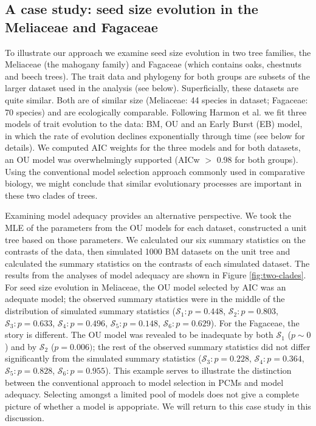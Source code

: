 \documentclass[a4paper,12pt]{article}
\begin{document}
\subsection{A case study: seed size evolution in the Meliaceae and Fagaceae }
To illustrate our approach we examine seed size evolution in two tree families, the Meliaceae (the mahogany family) and Fagaceae (which contains oaks, chestnuts and beech trees). The trait data and phylogeny for both groups are subsets of the larger dataset used in the analysis (see below). Superficially, these datasets are quite similar. Both are of similar size (Meliaceae: 44 species in dataset; Fagaceae: 70 species) and are ecologically comparable. Following Harmon et al. \citep{Harmon2010} we fit three models of trait evolution to the data: BM, OU and an Early Burst (EB) model, in which the rate of evolution declines exponentially through time \citep{Blomberg2003, Harmon2010} (see below for details). We computed AIC weights \citep{aicweight} for the three models and for both datasets, an OU model was overwhelmingly supported (AICw $>$ 0.98 for both groups). Using the conventional model selection approach commonly used in comparative biology, we might conclude that similar evolutionary processes are important in these two clades of trees.

Examining model adequacy provides an alternative perspective. We took the MLE of the parameters from the OU models for each dataset, constructed a unit tree based on those parameters. We calculated our six summary statistics on the contrasts of the data, then simulated 1000 BM datasets on the unit tree and calculated the summary statistics on the contrasts of each simulated dataset. The results from the analyses of model adequacy are shown in Figure \ref{fig:two-clades}. For seed size evolution in Meliaceae, the OU model selected by AIC was an adequate model; the observed summary statistics were in the middle of the distribution of simulated summary statistics ($\mathcal{S}_1: p=0.448$, $\mathcal{S}_2: p=0.803$, $\mathcal{S}_3: p=0.633$, $\mathcal{S}_4:p=0.496$, $\mathcal{S}_5: p=0.148$, $\mathcal{S}_6: p=0.629$). For the Fagaceae, the story is different. The OU model was revealed to be inadequate by both $\mathcal{S}_1$ ($p \sim 0$) and by $\mathcal{S}_2$ ($p=0.006)$; the rest of the observed summary statistics did not differ significantly from the simulated summary statistics ($\mathcal{S}_3: p=0.228$, $\mathcal{S}_4:p=0.364$, $\mathcal{S}_5: p=0.828$, $\mathcal{S}_6: p=0.955$). This example serves to illustrate the distinction between the conventional approach to model selection in PCMs and model adequacy. Selecting amongst a limited pool of models does not give a complete picture of whether a model is appopriate. We will return to this case study in this discussion.
\end{document}
